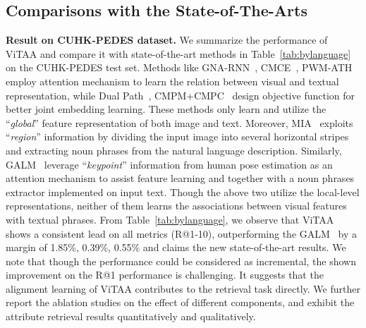 \documentclass[runningheads]{llncs}
\begin{document}
\subsection{Comparisons with the State-of-The-Arts}
\noindent\textbf{Result on CUHK-PEDES dataset.}
We summarize the performance of ViTAA and compare it with state-of-the-art methods in Table~\ref{tab:bylanguage} on the CUHK-PEDES test set. 
Methods like GNA-RNN~\cite{li2017person}, CMCE~\cite{li2017identity}, PWM-ATH~\cite{8354312} employ attention mechanism to learn the relation between visual and textual representation, while Dual Path~\cite{zheng2017dual}, CMPM+CMPC~\cite{zhang2018deep} design objective function for better joint embedding learning. These methods only learn and utilize the ``\textit{global}'' feature representation of both image and text. 
Moreover, MIA~\cite{niu2019improving} exploits ``\textit{region}'' information by dividing the input image into several horizontal stripes and extracting noun phrases from the natural language description. 
Similarly, GALM~\cite{jing2018pose} leverage ``\textit{keypoint}'' information from human pose estimation as an attention mechanism to assist feature learning and together with a noun phrases extractor implemented on input text.
Though the above two utilize the local-level representations, neither of them learns the associations between visual features with textual phrases. 
From Table~\ref{tab:bylanguage}, we observe that ViTAA shows a consistent lead on all metrics (R@1-10), outperforming the GALM~\cite{jing2018pose} by a margin of 1.85\%, 0.39\%, 0.55\% and claims the new state-of-the-art results. We note that though the performance could be considered as incremental, the shown improvement on the R@1 performance is challenging. It  suggests that the alignment learning of ViTAA contributes to the retrieval task directly. We further report the ablation studies on the effect of different components, and exhibit the attribute retrieval results quantitatively and qualitatively.
\end{document}
